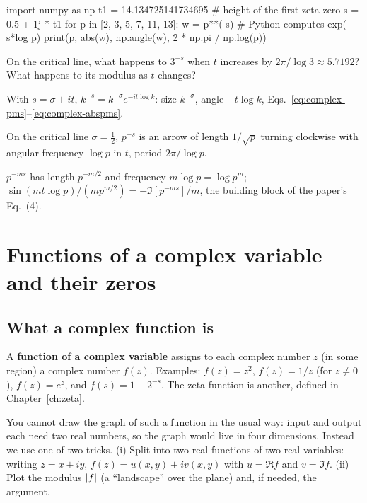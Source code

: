 \begin{pycode}
import numpy as np
t1 = 14.134725141734695     # height of the first zeta zero
s = 0.5 + 1j * t1
for p in [2, 3, 5, 7, 11, 13]:
    w = p**(-s)              # Python computes exp(-s*log p)
    print(p, abs(w), np.angle(w), 2 * np.pi / np.log(p))
\end{pycode}

\begin{checkpoint}
On the critical line, what happens to $3^{-s}$ when $t$ increases by $2\pi/\log3\approx5.7192$? What happens to its modulus as $t$ changes?
\end{checkpoint}

\begin{keyideas}
\item With $s=\sigma+it$, $k^{-s}=k^{-\sigma}e^{-it\log k}$: size $k^{-\sigma}$, angle $-t\log k$, Eqs.~\eqref{eq:complex-pms}--\eqref{eq:complex-abspms}.
\item On the critical line $\sigma=\tfrac12$, $p^{-s}$ is an arrow of length $1/\sqrt p$ turning clockwise with angular frequency $\log p$ in $t$, period $2\pi/\log p$.
\item $p^{-ms}$ has length $p^{-m/2}$ and frequency $m\log p=\log p^m$; $\sin(mt\log p)/(mp^{m/2})=-\Im[p^{-ms}]/m$, the building block of the paper's Eq.~(4).
\end{keyideas}

\section{Functions of a complex variable and their zeros}\label{sec:complex-functions}

\subsection{What a complex function is}

A \textbf{function of a complex variable} assigns to each complex number $z$ (in some region) a complex number $f(z)$. Examples: $f(z)=z^2$, $f(z)=1/z$ (for $z\ne0$), $f(z)=e^z$, and $f(s)=1-2^{-s}$. The zeta function is another, defined in Chapter~\ref{ch:zeta}.

You cannot draw the graph of such a function in the usual way: input and output each need two real numbers, so the graph would live in four dimensions. Instead we use one of two tricks. (i) Split into two real functions of two real variables: writing $z=x+iy$, $f(z)=u(x,y)+iv(x,y)$ with $u=\Re f$ and $v=\Im f$. (ii) Plot the modulus $\left\lvert f\right\rvert$ (a ``landscape'' over the plane) and, if needed, the argument.

